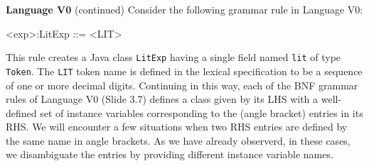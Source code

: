 \begin{minipage}[t]{\sw}
\slidenumber
\LARGE
{\bf Language V0} (continued)\exx
Consider the following grammar rule in Language V0:
\begin{qv}
<exp>:LitExp ::= <LIT>
\end{qv}
This rule creates a Java class \verb'LitExp'
having a single field named \verb'lit' of type \verb'Token'.
The \verb'LIT' token name is defined in the lexical specification
to be a sequence of one or more decimal digits.\exx
Continuing in this way,
each of the BNF grammar rules of Language V0 (Slide 3.7)
defines a class given by its LHS
with a well-defined set of instance variables
corresponding to the (angle bracket) entries in its RHS.\exx
We will encounter a few situations
when two RHS entries are defined by the same name in angle brackets.
As we have already observerd,
in these cases, we disambiguate the entries
by providing different instance variable names.
\end{minipage}
\clearpage
